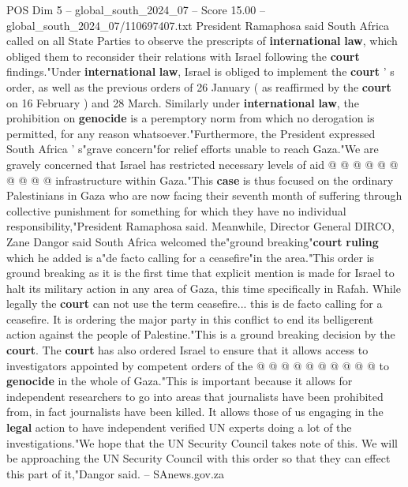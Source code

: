 \begin{textsample}{POS Dim 5 – global\_south\_2024\_07 – Score 15.00 – global\_south\_2024\_07/110697407.txt}
President Ramaphosa said South Africa called on all State Parties to observe the prescripts of \textbf{international} \textbf{law}, which obliged them to reconsider their relations with Israel following the \textbf{court} findings."Under \textbf{international} \textbf{law}, Israel is obliged to implement the \textbf{court} ' s order, as well as the previous orders of 26 January ( as reaffirmed by the \textbf{court} on 16 February ) and 28 March.
Similarly under \textbf{international} \textbf{law}, the prohibition on \textbf{genocide} is a peremptory norm from which no derogation is permitted, for any reason whatsoever."Furthermore, the President expressed South Africa ' s"grave concern"for relief efforts unable to reach Gaza."We are gravely concerned that Israel has restricted necessary levels of aid @ @ @ @ @ @ @ @ @ @ infrastructure within Gaza."This \textbf{case} is thus focused on the ordinary Palestinians in Gaza who are now facing their seventh month of suffering through collective punishment for something for which they have no individual responsibility,"President Ramaphosa said.
Meanwhile, Director General DIRCO, Zane Dangor said South Africa welcomed the"ground breaking"\textbf{court} \textbf{ruling} which he added is a"de facto calling for a ceasefire"in the area."This order is ground breaking as it is the first time that explicit mention is made for Israel to halt its military action in any area of Gaza, this time specifically in Rafah.
While legally the \textbf{court} can not use the term ceasefire... this is de facto calling for a ceasefire.
It is ordering the major party in this conflict to end its belligerent action against the people of Palestine."This is a ground breaking decision by the \textbf{court}.
The \textbf{court} has also ordered Israel to ensure that it allows access to investigators appointed by competent orders of the @ @ @ @ @ @ @ @ @ @ to \textbf{genocide} in the whole of Gaza."This is important because it allows for independent researchers to go into areas that journalists have been prohibited from, in fact journalists have been killed.
It allows those of us engaging in the \textbf{legal} action to have independent verified UN experts doing a lot of the investigations."We hope that the UN Security Council takes note of this.
We will be approaching the UN Security Council with this order so that they can effect this part of it,"Dangor said. -- SAnews.gov.za

\end{textsample}

